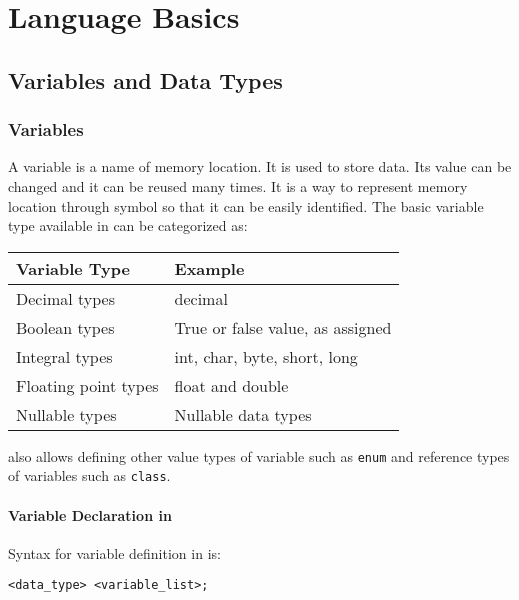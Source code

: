 \chapter{ Language Basics}
\section{Variables and Data Types}
\subsection{Variables}

A variable is a name of memory location. It is used to store data. Its value can be changed and it can be reused many times. It is a way to represent memory location through symbol so that it can be easily identified. The basic variable type available in {\cs} can be categorized as:


	\begin{table}[hb]
		\centering
		\begin{tabular}{ll}
			\toprule
			\textbf{Variable Type} & \textbf{Example}                 \\ \midrule
			Decimal types          & decimal                          \\
			Boolean types          & True or false value, as assigned \\
			Integral types         & int, char, byte, short, long     \\
			Floating point types   & float and double                 \\
			Nullable types         & Nullable data types              \\ \bottomrule
		\end{tabular}
	\end{table}

{\cs} also allows defining other value types of variable such as \verb|enum| and reference types of variables such as \verb|class|.

\subsubsection*{Variable Declaration in {\cs}}
Syntax for variable definition in {\cs} is:
\begin{lstlisting}[numbers=none]
	<data_type> <variable_list>;
\end{lstlisting}

